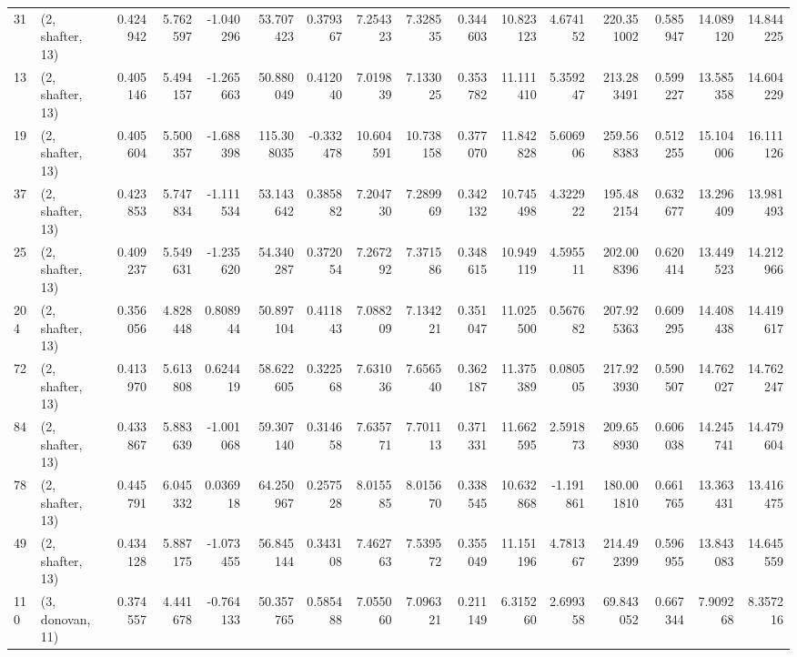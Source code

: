 \begin{tabular}{llrrrrrrrrrrrrrr}
31  &  (2, shafter, 13) &   0.424942 &   5.762597 &  -1.040296 &    53.707423 &   0.379367 &   7.254323 &   7.328535 &  0.344603 &  10.823123 &   4.674152 &   220.351002 &   0.585947 &  14.089120 &  14.844225 \\
13  &  (2, shafter, 13) &   0.405146 &   5.494157 &  -1.265663 &    50.880049 &   0.412040 &   7.019839 &   7.133025 &  0.353782 &  11.111410 &   5.359247 &   213.283491 &   0.599227 &  13.585358 &  14.604229 \\
19  &  (2, shafter, 13) &   0.405604 &   5.500357 &  -1.688398 &   115.308035 &  -0.332478 &  10.604591 &  10.738158 &  0.377070 &  11.842828 &   5.606906 &   259.568383 &   0.512255 &  15.104006 &  16.111126 \\
37  &  (2, shafter, 13) &   0.423853 &   5.747834 &  -1.111534 &    53.143642 &   0.385882 &   7.204730 &   7.289969 &  0.342132 &  10.745498 &   4.322922 &   195.482154 &   0.632677 &  13.296409 &  13.981493 \\
25  &  (2, shafter, 13) &   0.409237 &   5.549631 &  -1.235620 &    54.340287 &   0.372054 &   7.267292 &   7.371586 &  0.348615 &  10.949119 &   4.595511 &   202.008396 &   0.620414 &  13.449523 &  14.212966 \\
204 &  (2, shafter, 13) &   0.356056 &   4.828448 &   0.808944 &    50.897104 &   0.411843 &   7.088209 &   7.134221 &  0.351047 &  11.025500 &   0.567682 &   207.925363 &   0.609295 &  14.408438 &  14.419617 \\
72  &  (2, shafter, 13) &   0.413970 &   5.613808 &   0.624419 &    58.622605 &   0.322568 &   7.631036 &   7.656540 &  0.362187 &  11.375389 &   0.080505 &   217.923930 &   0.590507 &  14.762027 &  14.762247 \\
84  &  (2, shafter, 13) &   0.433867 &   5.883639 &  -1.001068 &    59.307140 &   0.314658 &   7.635771 &   7.701113 &  0.371331 &  11.662595 &   2.591873 &   209.658930 &   0.606038 &  14.245741 &  14.479604 \\
78  &  (2, shafter, 13) &   0.445791 &   6.045332 &   0.036918 &    64.250967 &   0.257528 &   8.015585 &   8.015670 &  0.338545 &  10.632868 &  -1.191861 &   180.001810 &   0.661765 &  13.363431 &  13.416475 \\
49  &  (2, shafter, 13) &   0.434128 &   5.887175 &  -1.073455 &    56.845144 &   0.343108 &   7.462763 &   7.539572 &  0.355049 &  11.151196 &   4.781367 &   214.492399 &   0.596955 &  13.843083 &  14.645559 \\
110 &  (3, donovan, 11) &   0.374557 &   4.441678 &  -0.764133 &    50.357765 &   0.585488 &   7.055060 &   7.096321 &  0.211149 &   6.315260 &   2.699358 &    69.843052 &   0.667344 &   7.909268 &   8.357216 \\

\end{tabular}
